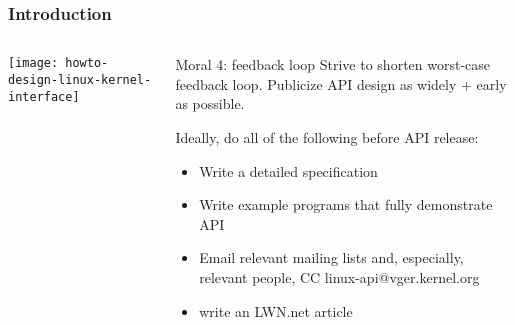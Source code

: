 \begin{frame}[plain]
	\frametitle{Introduction}
	
	
	
	\begin{columns}
		
		\begin{column}{.4\textwidth}
			
			\texttt{[image: howto-design-linux-kernel-interface]}
			
		\end{column}
		
		\begin{column}{.6\textwidth}
			\Large
			\begin{block}{Moral 4: feedback loop}
				Strive to shorten worst-case
				feedback loop. Publicize API design
				as widely + early as possible.		
					
			\end{block} 
		
			\normalsize
			Ideally, do all of the following before API release:
			
			\begin{itemize}
				\item Write a detailed specification
				\item Write example programs that fully demonstrate API				
				\item Email relevant mailing lists and, especially, relevant people, CC linux-api@vger.kernel.org
				
				\item write an LWN.net article
				
			\end{itemize}
		\end{column}
		
		
	\end{columns}
	
	
\end{frame}


